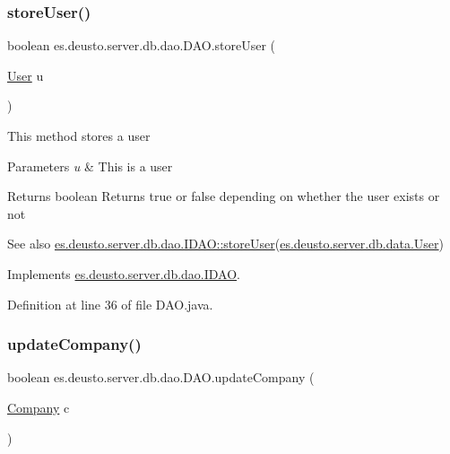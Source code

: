 \subsubsection{\texorpdfstring{store\+User()}{storeUser()}}
{\footnotesize\ttfamily boolean es.\+deusto.\+server.\+db.\+dao.\+D\+A\+O.\+store\+User (\begin{DoxyParamCaption}\item[{\hyperlink{classes_1_1deusto_1_1server_1_1db_1_1data_1_1_user}{User}}]{u }\end{DoxyParamCaption})}

This method stores a user 
\begin{DoxyParams}{Parameters}
{\em u} & This is a user \\
\hline
\end{DoxyParams}
\begin{DoxyReturn}{Returns}
boolean Returns true or false depending on whether the user exists or not 
\end{DoxyReturn}
\begin{DoxySeeAlso}{See also}
\hyperlink{interfacees_1_1deusto_1_1server_1_1db_1_1dao_1_1_i_d_a_o_ab943216560f43595a852b406dcd394a4}{es.\+deusto.\+server.\+db.\+dao.\+I\+D\+A\+O\+::store\+User}(\hyperlink{classes_1_1deusto_1_1server_1_1db_1_1data_1_1_user}{es.\+deusto.\+server.\+db.\+data.\+User}) 
\end{DoxySeeAlso}


Implements \hyperlink{interfacees_1_1deusto_1_1server_1_1db_1_1dao_1_1_i_d_a_o_ab943216560f43595a852b406dcd394a4}{es.\+deusto.\+server.\+db.\+dao.\+I\+D\+AO}.



Definition at line 36 of file D\+A\+O.\+java.

\mbox{\label{classes_1_1deusto_1_1server_1_1db_1_1dao_1_1_d_a_o_a0748467c3346a5bcdcd79b508562b6dc}} 
\subsubsection{\texorpdfstring{update\+Company()}{updateCompany()}}
{\footnotesize\ttfamily boolean es.\+deusto.\+server.\+db.\+dao.\+D\+A\+O.\+update\+Company (\begin{DoxyParamCaption}\item[{\hyperlink{classes_1_1deusto_1_1server_1_1db_1_1data_1_1_company}{Company}}]{c }\end{DoxyParamCaption})}

